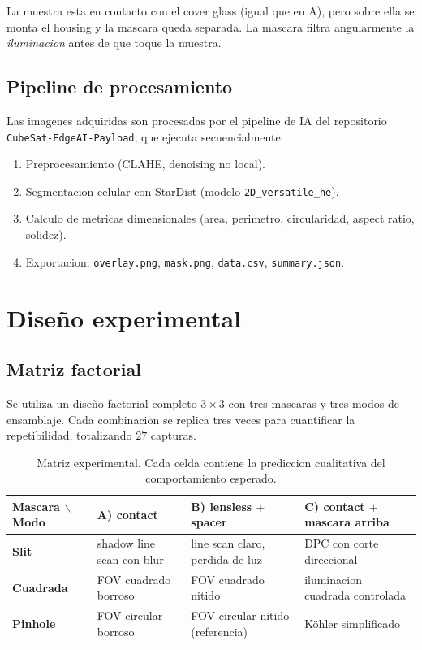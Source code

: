 \documentclass[11pt,a4paper,oneside]{report}
\begin{document}
La muestra esta en contacto con el cover glass (igual que en A), pero
sobre ella se monta el housing y la mascara queda separada. La mascara
filtra angularmente la \emph{iluminacion} antes de que toque la muestra.

\section{Pipeline de procesamiento}

Las imagenes adquiridas son procesadas por el pipeline de IA del repositorio
\texttt{CubeSat-EdgeAI-Payload}, que ejecuta secuencialmente:

\begin{enumerate}[leftmargin=2.2em]
  \item Preprocesamiento (CLAHE, denoising no local).
  \item Segmentacion celular con StarDist (modelo \texttt{2D\_versatile\_he}).
  \item Calculo de metricas dimensionales (area, perimetro, circularidad,
        aspect ratio, solidez).
  \item Exportacion: \texttt{overlay.png}, \texttt{mask.png}, \texttt{data.csv},
        \texttt{summary.json}.
\end{enumerate}

\chapter{Diseño experimental}

\section{Matriz factorial}

Se utiliza un diseño factorial completo $3 \times 3$ con tres mascaras
y tres modos de ensamblaje. Cada combinacion se replica tres veces para
cuantificar la repetibilidad, totalizando $27$ capturas.

\begin{table}[h!]
\centering
\caption{Matriz experimental. Cada celda contiene la prediccion cualitativa
del comportamiento esperado.}
\renewcommand{\arraystretch}{1.4}
\begin{tabular}{p{2.5cm}p{3.5cm}p{3.5cm}p{4cm}}
\toprule
\textbf{Mascara $\backslash$ Modo} & \textbf{A) contact} & \textbf{B) lensless $+$ spacer} & \textbf{C) contact $+$ mascara arriba} \\
\midrule
\textbf{Slit} & shadow line scan con blur & line scan claro, perdida de luz & DPC con corte direccional \\
\textbf{Cuadrada} & FOV cuadrado borroso & FOV cuadrado nitido & iluminacion cuadrada controlada \\
\textbf{Pinhole} & FOV circular borroso & FOV circular nitido (referencia) & Köhler simplificado \\
\bottomrule
\end{tabular}
\label{tab:matriz}
\end{table}
\end{document}
